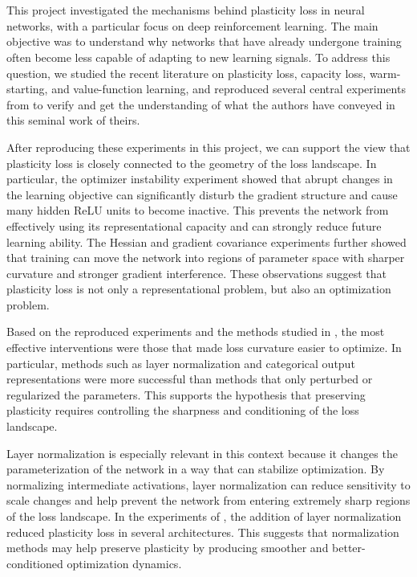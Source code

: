 \section{}\label{sec:conclusion}

This project investigated the mechanisms behind plasticity loss in neural networks, with a particular focus on deep reinforcement learning. The main objective was to understand why networks that have already undergone training often become less capable of adapting to new learning signals. To address this question, we studied the recent literature on plasticity loss, capacity loss, warm-starting, and value-function learning, and reproduced several central experiments from \citep{lyle2023understanding} to verify and get the understanding of what the authors have conveyed in this seminal work of theirs.

After reproducing these experiments in this project, we can support the view that plasticity loss is closely connected to the geometry of the loss landscape. In particular, the optimizer instability experiment showed that abrupt changes in the learning objective can significantly disturb the gradient structure and cause many hidden ReLU units to become inactive. This prevents the network from effectively using its representational capacity and can strongly reduce future learning ability. The Hessian and gradient covariance experiments further showed that training can move the network into regions of parameter space with sharper curvature and stronger gradient interference. These observations suggest that plasticity loss is not only a representational problem, but also an optimization problem.

Based on the reproduced experiments and the methods studied in \citep{lyle2023understanding}, the most effective interventions were those that made loss curvature easier to optimize. In particular, methods such as layer normalization and categorical output representations were more successful than methods that only perturbed or regularized the parameters. This supports the hypothesis that preserving plasticity requires controlling the sharpness and conditioning of the loss landscape.

Layer normalization is especially relevant in this context because it changes the parameterization of the network in a way that can stabilize optimization. By normalizing intermediate activations, layer normalization can reduce sensitivity to scale changes and help prevent the network from entering extremely sharp regions of the loss landscape. In the experiments of \citep{lyle2023understanding}, the addition of layer normalization reduced plasticity loss in several architectures. This suggests that normalization methods may help preserve plasticity by producing smoother and better-conditioned optimization dynamics.

